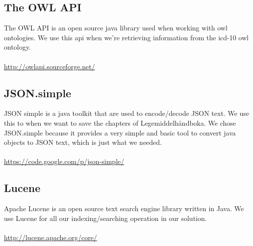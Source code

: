 \subsection*{The OWL API}
The OWL API is an open source java library used when working with owl
ontologies. We use this api when we’re retrieving information from the icd-10
owl ontology.\\\\
\url{http://owlapi.sourceforge.net/}

\subsection*{JSON.simple}
JSON simple is a java toolkit that are used to encode/decode JSON text. We use
this to when we want to save the chapters of Legemiddelhåndboka. We chose
JSON.simple because it provides a very simple and basic tool to convert java
objects to JSON text, which is just what we needed.\\\\
\url{https://code.google.com/p/json-simple/}

\subsection*{Lucene}
Apache Lucene is an open source text search engine library written in Java. We
use Lucene for all our indexing/searching operation in our solution.\\\\
\url{http://lucene.apache.org/core/}

